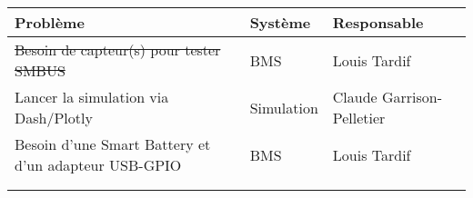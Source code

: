 \begin{tabularx}{\linewidth}{
    |>{\hsize=2.0\hsize}X|%
    >{\hsize=0.5\hsize}X|%
    >{\hsize=0.5\hsize}X|%
  }
    \hline
    \textbf{Problème} & \textbf{Système} & \textbf{Responsable} \\\hline
    \st{Besoin de capteur(s) pour tester SMBUS} & BMS & Louis Tardif \\\hline
    Lancer la simulation via Dash/Plotly& Simulation & Claude Garrison-Pelletier \\\hline
    Besoin d'une Smart Battery et d'un adapteur USB-GPIO & BMS & Louis Tardif \\\hline
    &  &  \\\hline
    &  &  \\\hline
  \end{tabularx}
    
    
